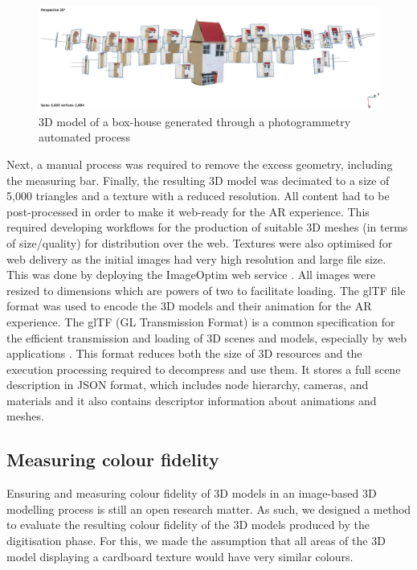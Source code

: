 \documentclass[acmlarge,screen,dvipsnames]{acmart}
\begin{document}
\begin{figure}[h] \centering
\includegraphics[width=1\linewidth]{images/metashape.png} 
\caption{3D model of a box-house generated through a photogrammetry automated
process} \label{fig:metashape}  
\end{figure}


Next, a manual process was required to remove the excess geometry,
including the measuring bar. Finally, the resulting 3D model was
decimated to a size of 5,000 triangles and a texture with a reduced
resolution. All content had to be post-processed in order to make it
web-ready for the AR experience. This required developing workflows for
the production of suitable 3D meshes (in terms of size/quality) for
distribution over the web.  %
Textures were also optimised for web delivery as the initial images had %
very high resolution and large file size. This was done by deploying %
the ImageOptim web service \cite{ImageOptim}.   %
All images were resized to dimensions which are powers of two
to facilitate loading. 
The glTF file format was used to encode the 3D models and their animation for the AR
experience. The glTF (GL Transmission Format) is a common specification for
the efficient transmission and loading of 3D scenes and models,
especially by web applications \cite{khronos}. This format reduces both the size
of 3D resources and the execution processing required to decompress and
use them. It stores a full scene description in JSON format, which
includes node hierarchy, cameras, and materials and it also contains
descriptor information about animations and meshes.


\subsection{Measuring colour fidelity} Ensuring and measuring colour
fidelity of 3D models in an image-based 3D modelling process is still an
open research matter. As such, we designed a method to evaluate the
resulting colour fidelity of the 3D models produced by the
digitisation phase. For this, we made the assumption that all areas of
the 3D model displaying a cardboard texture would have very similar
colours.
\end{document}
